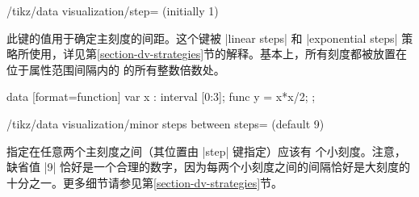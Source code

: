 \begin{key}{/tikz/data visualization/step= (initially 1)} %

    此键的值用于确定主刻度的间距。这个键被 |linear steps| 和 |exponential steps| 策略所使用，详见第\ref{section-dv-strategies}节的解释。基本上，所有刻度都被放置在位于属性范围间隔内的  的所有整数倍数处。
\begin{codeexample}[preamble={\usetikzlibrary{datavisualization.formats.functions}}]
\tikz \datavisualization [
    school book axes, visualize as smooth line,
    y axis={ticks={step=1.25}},
  ]
    data [format=function] {
      var x : interval [0:3];
      func y = \value x*\value x/2;
    };
\end{codeexample}
\end{key}

\begin{key}{/tikz/data visualization/minor steps between steps= (default 9)} %

    指定在任意两个主刻度之间（其位置由 |step| 键指定）应该有  个小刻度。注意，缺省值 |9| 恰好是一个合理的数字，因为每两个小刻度之间的间隔恰好是大刻度的十分之一。更多细节请参见第\ref{section-dv-strategies}节。
\begin{codeexample}[preamble={\usetikzlibrary{datavisualization.formats.functions}}]
\end{codeexample}
\end{key}

